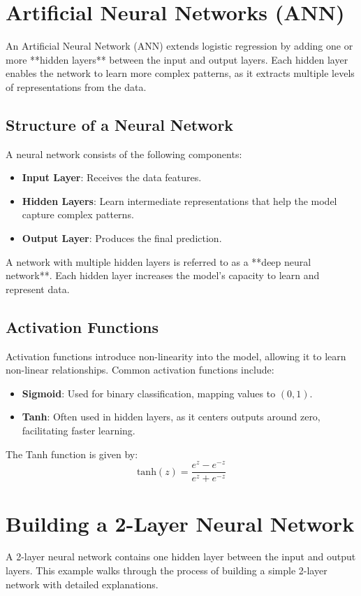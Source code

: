 \documentclass{article}
\begin{document}
\newpage
\section{Artificial Neural Networks (ANN)}
An Artificial Neural Network (ANN) extends logistic regression by adding one or more **hidden layers** between the input and output layers. Each hidden layer enables the network to learn more complex patterns, as it extracts multiple levels of representations from the data.

\subsection{Structure of a Neural Network}
A neural network consists of the following components:
\begin{itemize}
    \item \textbf{Input Layer}: Receives the data features.
    \item \textbf{Hidden Layers}: Learn intermediate representations that help the model capture complex patterns.
    \item \textbf{Output Layer}: Produces the final prediction.
\end{itemize}

A network with multiple hidden layers is referred to as a **deep neural network**. Each hidden layer increases the model's capacity to learn and represent data.

\subsection{Activation Functions}
Activation functions introduce non-linearity into the model, allowing it to learn non-linear relationships. Common activation functions include:
\begin{itemize}
    \item \textbf{Sigmoid}: Used for binary classification, mapping values to $(0, 1)$.
    \item \textbf{Tanh}: Often used in hidden layers, as it centers outputs around zero, facilitating faster learning.
\end{itemize}

The Tanh function is given by:
\[
\text{tanh}(z) = \frac{e^z - e^{-z}}{e^z + e^{-z}}
\]

\newpage
\section{Building a 2-Layer Neural Network}
A 2-layer neural network contains one hidden layer between the input and output layers. This example walks through the process of building a simple 2-layer network with detailed explanations.
\end{document}
